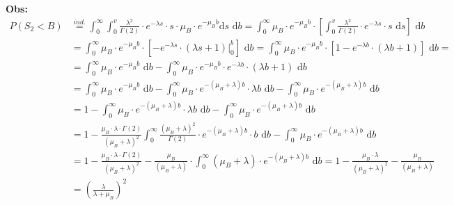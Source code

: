 \documentclass[12pt]{article}
\begin{document}
	 \textbf{Obs:} 
	  \begin{equation*}
		  \begin{split}
			 P(S_2 < B) & \stackrel{ind.}{=} \int_{0}^{\infty} \int_{0}^{v} \frac{\lambda^2}{\Gamma(2)} \cdot e^{-\lambda s} \cdot s \cdot \mu_B\cdot e^{-\mu_Bb} \text{d}s \text{ d}b = \int_{0}^{\infty} \mu_B\cdot e^{-\mu_Bb} \cdot \left[\int_{0}^{v} \frac{\lambda^2}{\Gamma(2)} \cdot  e^{-\lambda s} \cdot s \text{ d}s \right]\text{ d}b \\
			 & = \int_{0}^{\infty} \mu_B\cdot e^{-\mu_Bb} \cdot \left[ -e^{-\lambda s} \cdot (\lambda s + 1) \rvert_{0}^{b} \right]\text{ d}b =  \int_{0}^{\infty} \mu_B\cdot e^{-\mu_Bb} \cdot \left[ 1 - e^{-\lambda b} \cdot (\lambda b + 1) \right]\text{ d}b = \\
			 & = \int_{0}^{\infty} \mu_B\cdot e^{-\mu_Bb} \text{ d}b - \int_{0}^{\infty} \mu_B\cdot e^{-\mu_Bb} \cdot  e^{-\lambda b} \cdot (\lambda b + 1)\text{ d}b \\
			 & = \int_{0}^{\infty} \mu_B\cdot e^{-\mu_Bb} \text{ d}b - \int_{0}^{\infty} \mu_B\cdot e^{-(\mu_B + \lambda)b} \cdot \lambda b \text{ d}b - \int_{0}^{\infty} \mu_B\cdot e^{-(\mu_B + \lambda)b} \text{ d}b \\
			 & = 1 - \int_{0}^{\infty} \mu_B\cdot e^{-(\mu_B + \lambda)b} \cdot \lambda b \text{ d}b - \int_{0}^{\infty} \mu_B\cdot e^{-(\mu_B + \lambda)b} \text{ d}b \\
			 & = 1 - \frac{\mu_B \cdot \lambda \cdot \Gamma(2)}{(\mu_B + \lambda)^2}\int_{0}^{\infty} \frac{(\mu_B + \lambda)^2}{\Gamma(2)} \cdot e^{-(\mu_B + \lambda)b} \cdot b \text{ d}b - \int_{0}^{\infty} \mu_B\cdot e^{-(\mu_B + \lambda)b} \text{ d}b \\
			 & = 1 - \frac{\mu_B \cdot \lambda \cdot \Gamma(2)}{(\mu_B + \lambda)^2}- \frac{\mu_B}{(\mu_B + \lambda)} \cdot \int_{0}^{\infty} (\mu_B + \lambda) \cdot e^{-(\mu_B + \lambda)b} \text{ d}b =  1 - \frac{\mu_B \cdot \lambda}{(\mu_B + \lambda)^2}- \frac{\mu_B}{(\mu_B + \lambda)} \\
			 & = \left(\frac{\lambda}{\lambda + \mu_B} \right)^2
		  \end{split}
	  \end{equation*}
	 
\end{document}
